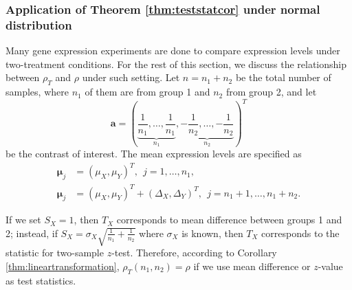 \subsubsection{Application of Theorem \ref{thm:teststatcor} under normal distribution}

Many gene expression experiments are done to compare expression levels under two-treatment 
conditions. For the rest of this section, we discuss the relationship between $\rho_T$ and 
$\rho$ under such setting.
Let $n = n_1 + n_2$ be the total number of samples, where $n_1$ of them are from group 1 and 
$n_2$ from group 2, and let
\begin{equation}\label{eq:contrast}
\bm a  = (\underbrace{\frac{1}{n_1}, \ldots, \frac{1}{n_1}}_{n_1}, \underbrace{-\frac{1}{n_2}, 
	\ldots, -\frac{1}{n_2}}_{n_2})^T
\end{equation}
be the contrast of interest. 
The mean expression levels are specified as 
\begin{equation}\label{eq:meanTwogroup}
\begin{aligned}
\bm \mu_j &= (\mu_X, \mu_Y)^T,~~ j = 1, \ldots, n_1, \\
\bm \mu_j &= (\mu_X,  \mu_Y)^T  + ( \Delta_X,\Delta_Y)^T, ~~j = n_1 + 1, \ldots, n_1 + n_2.
\end{aligned}
\end{equation}


If we set $S_X=1$, then $T_X$ corresponds to mean difference between groups 1 and 2; instead, 
if $S_X = \sigma_X\sqrt{\frac{1}{n_1} + \frac{1}{n_2}}$ where $\sigma_X$ is known, then $T_X$ 
corresponds to the statistic for two-sample $z$-test. Therefore, according to Corollary 
\ref{thm:lineartransformation},  $\rho_T(n_1,n_2)=\rho$ if we use mean difference or $z$-value as 
test 
statistics.

